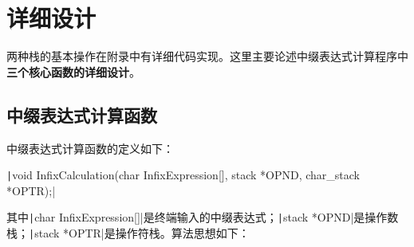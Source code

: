 \documentclass[10pt,a4paper]{article}
\begin{document}
	\section{详细设计}
	\noindent 两种栈的基本操作在附录中有详细代码实现。这里主要论述中缀表达式计算程序中\textbf{三个核心函数的详细设计}。
	\subsection{中缀表达式计算函数}
	\noindent 中缀表达式计算函数的定义如下：
	\begin{center}
		\texttt|void InfixCalculation(char InfixExpression[], stack *OPND, char_stack *OPTR);|
	\end{center}
	其中\texttt|char InfixExpression[]|是终端输入的中缀表达式；\texttt|stack *OPND|是操作数栈；\texttt|stack *OPTR|是操作符栈。算法思想如下：
\end{document}

